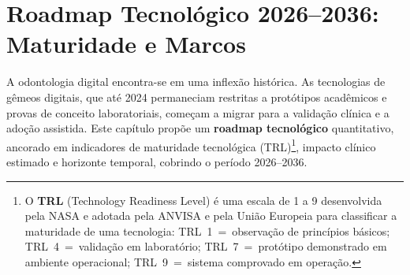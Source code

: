 


\section{Roadmap Tecnológico 2026–2036: Maturidade e Marcos}

A odontologia digital encontra-se em uma inflexão histórica. As
tecnologias de gêmeos digitais, que até 2024 permaneciam restritas a
protótipos acadêmicos e provas de conceito laboratoriais, começam a
migrar para a validação clínica e a adoção assistida. Este capítulo
propõe um \textbf{roadmap tecnológico} quantitativo, ancorado em
indicadores de maturidade tecnológica (TRL)\footnote{O
\textbf{TRL} (Technology Readiness Level) é uma escala de 1 a 9
desenvolvida pela NASA e adotada pela ANVISA e pela União Europeia
para classificar a maturidade de uma tecnologia: TRL~1~=~observação
de princípios básicos; TRL~4~=~validação em laboratório;
TRL~7~=~protótipo demonstrado em ambiente operacional;
TRL~9~=~sistema comprovado em operação.}, impacto clínico estimado
e horizonte temporal, cobrindo o período 2026--2036.


